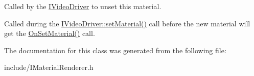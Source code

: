Called by the \hyperlink{classirr_1_1video_1_1IVideoDriver}{I\+Video\+Driver} to unset this material. 

Called during the \hyperlink{classirr_1_1video_1_1IVideoDriver_a8c9e31b41b7e6fd26cf65ce538ebab05}{I\+Video\+Driver\+::set\+Material()} call before the new material will get the \hyperlink{classirr_1_1video_1_1IMaterialRenderer_aeaffc03c1b9feb40cd01469726b287e3}{On\+Set\+Material()} call. 

The documentation for this class was generated from the following file\+:\begin{DoxyCompactItemize}
\item 
include/I\+Material\+Renderer.\+h\end{DoxyCompactItemize}

